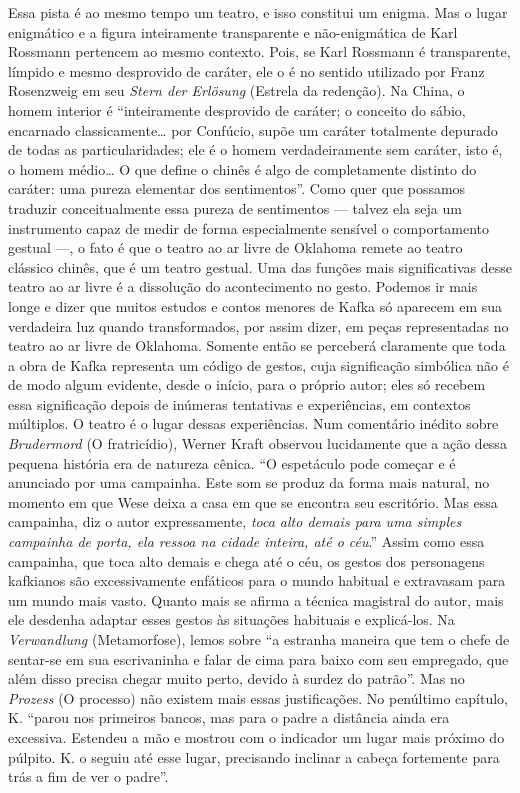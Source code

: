 Essa pista é ao mesmo tempo um teatro, e isso constitui um enigma. Mas o
lugar enigmático e a figura inteiramente transparente e não-enigmática
de Karl Rossmann pertencem ao mesmo contexto. Pois, se Karl Rossmann é
transparente, límpido e mesmo desprovido de caráter, ele o é no sentido
utilizado por Franz Rosenzweig em seu \textit{Stern der Erlösung} (Estrela da
redenção). Na China, o homem interior é ``inteiramente desprovido de
caráter; o conceito do sábio, encarnado classicamente\ldots{} por Confúcio,
supõe um caráter totalmente depurado de todas as particularidades; ele é
o homem verdadeiramente sem caráter, isto é, o homem médio\ldots{} O que
define o chinês é algo de completamente distinto do caráter: uma pureza
elementar dos sentimentos''. Como quer que possamos traduzir
conceitualmente essa pureza de sentimentos --- talvez ela seja um
instrumento capaz de medir de forma especialmente sensível o
comportamento gestual ---, o fato é que o teatro ao ar livre de Oklahoma
remete ao teatro clássico chinês, que é um teatro gestual. Uma das
funções mais significativas desse teatro ao ar livre é a dissolução do
acontecimento no gesto. Podemos ir mais longe e dizer que muitos estudos
e contos menores de Kafka só aparecem em sua verdadeira luz quando
transformados, por assim dizer, em peças representadas no teatro ao ar
livre de Oklahoma. Somente então se perceberá claramente que toda a obra
de Kafka representa um código de gestos, cuja significação simbólica não
é de modo algum evidente, desde o início, para o próprio autor; eles só
recebem essa significação depois de inúmeras tentativas e experiências,
em contextos múltiplos. O teatro é o lugar dessas experiências. Num
comentário inédito sobre \textit{Brudermord} (O fratricídio), Werner Kraft
observou lucidamente que a ação dessa pequena história era de natureza
cênica. ``O espetáculo pode começar e é anunciado por uma campainha.
Este som se produz da forma mais natural, no momento em que Wese deixa a
casa em que se encontra seu escritório. Mas essa campainha, diz o autor
expressamente, \textit{toca alto demais para uma simples campainha de porta,
ela ressoa na cidade inteira, até o céu}.'' Assim como essa campainha,
que toca alto demais e chega até o céu, os gestos dos personagens
kafkianos são excessivamente enfáticos para o mundo habitual e
extravasam para um mundo mais vasto. Quanto mais se afirma a técnica
magistral do autor, mais ele desdenha adaptar esses gestos às situações
habituais e explicá-los. Na \textit{Verwandlung} (Metamorfose), lemos sobre
``a estranha maneira que tem o chefe de sentar-se em sua escrivaninha e
falar de cima para baixo com seu empregado, que além disso precisa
chegar muito perto, devido à surdez do patrão''. Mas no \textit{Prozess} (O
processo) não existem mais essas justificações. No penúltimo capítulo,
K. ``parou nos primeiros bancos, mas para o padre a distância ainda era
excessiva. Estendeu a mão e mostrou com o indicador um lugar mais
próximo do púlpito. K. o seguiu até esse lugar, precisando inclinar a
cabeça fortemente para trás a fim de ver o padre''.

